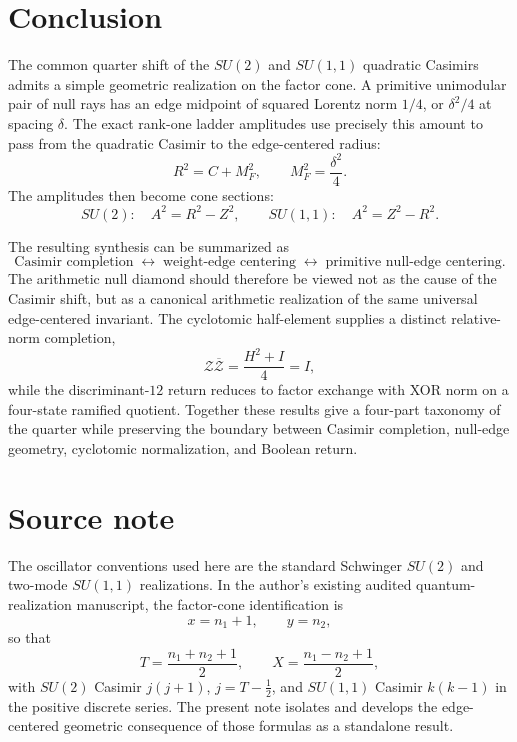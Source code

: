 \documentclass[11pt]{article}
\theoremstyle{remark}
\begin{document}
\section{Conclusion}

The common quarter shift of the $SU(2)$ and $SU(1,1)$ quadratic Casimirs admits a simple geometric realization on the factor cone.  A primitive unimodular pair of null rays has an edge midpoint of squared Lorentz norm $1/4$, or $\delta^2/4$ at spacing $\delta$.  The exact rank-one ladder amplitudes use precisely this amount to pass from the quadratic Casimir to the edge-centered radius:
\[
\boxed{
R^2=C+M_F^2,
\qquad
M_F^2=\frac{\delta^2}{4}.
}
\]
The amplitudes then become cone sections:
\[
SU(2):\quad A^2=R^2-Z^2,
\qquad
SU(1,1):\quad A^2=Z^2-R^2.
\]

The resulting synthesis can be summarized as
\[
\boxed{
\text{Casimir completion}
\;\longleftrightarrow\;
\text{weight-edge centering}
\;\longleftrightarrow\;
\text{primitive null-edge centering}.
}
\]
The arithmetic null diamond should therefore be viewed not as the cause of the Casimir shift, but as a canonical arithmetic realization of the same universal edge-centered invariant.  The cyclotomic half-element supplies a distinct relative-norm completion,
\[
\mathcal Z\overline{\mathcal Z}=\frac{H^2+I}{4}=I,
\]
while the discriminant-$12$ return reduces to factor exchange with XOR norm on
a four-state ramified quotient.  Together these results give a four-part
taxonomy of the quarter while preserving the boundary between Casimir
completion, null-edge geometry, cyclotomic normalization, and Boolean return.

\section*{Source note}

The oscillator conventions used here are the standard Schwinger $SU(2)$ and two-mode $SU(1,1)$ realizations.  In the author's existing audited quantum-realization manuscript, the factor-cone identification is
\[
x=n_1+1,\qquad y=n_2,
\]
so that
\[
T=\frac{n_1+n_2+1}{2},\qquad
X=\frac{n_1-n_2+1}{2},
\]
with $SU(2)$ Casimir $j(j+1)$, $j=T-\tfrac12$, and $SU(1,1)$ Casimir $k(k-1)$ in the positive discrete series.  The present note isolates and develops the edge-centered geometric consequence of those formulas as a standalone result.
\end{document}
